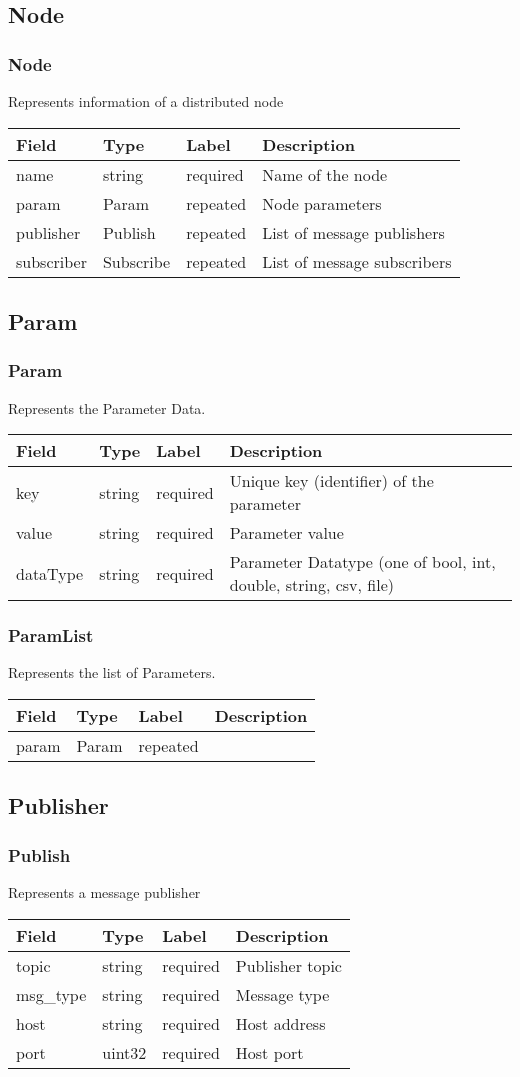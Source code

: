 \subsection{Node}\label{node.proto}
\subsubsection*{Node} Represents information of a distributed node
\begin{longtable}[l]{@{}llll@{}}
\toprule
Field & Type & Label & Description\tabularnewline
\midrule
\endhead
name & string & required & Name of the node\tabularnewline
param & Param & repeated & Node parameters\tabularnewline
publisher & Publish & repeated & List of message
publishers\tabularnewline
subscriber & Subscribe & repeated & List of message
subscribers\tabularnewline
\bottomrule
\end{longtable}
\subsection{Param}\label{param.proto}
\subsubsection*{Param} Represents the Parameter Data.
\begin{longtable}[l]{@{}llll@{}}
\toprule
Field & Type & Label & Description\tabularnewline
\midrule
\endhead
key & string & required & Unique key (identifier) of the
parameter\tabularnewline
value & string & required & Parameter value\tabularnewline
dataType & string & required & Parameter Datatype (one of bool, int,
double, string, csv, file)\tabularnewline
\bottomrule
\end{longtable}
\subsubsection*{ParamList} Represents the list of Parameters.
\begin{longtable}[l]{@{}llll@{}}
\toprule
Field & Type & Label & Description\tabularnewline
\midrule
\endhead
param & Param & repeated &\tabularnewline
\bottomrule
\end{longtable}
\subsection{Publisher}\label{publish.proto}
\subsubsection*{Publish} Represents a message publisher
\begin{longtable}[l]{@{}llll@{}}
\toprule
Field & Type & Label & Description\tabularnewline
\midrule
\endhead
topic & string & required & Publisher topic\tabularnewline
msg\_type & string & required & Message type\tabularnewline
host & string & required & Host address\tabularnewline
port & uint32 & required & Host port\tabularnewline
\bottomrule
\end{longtable}
